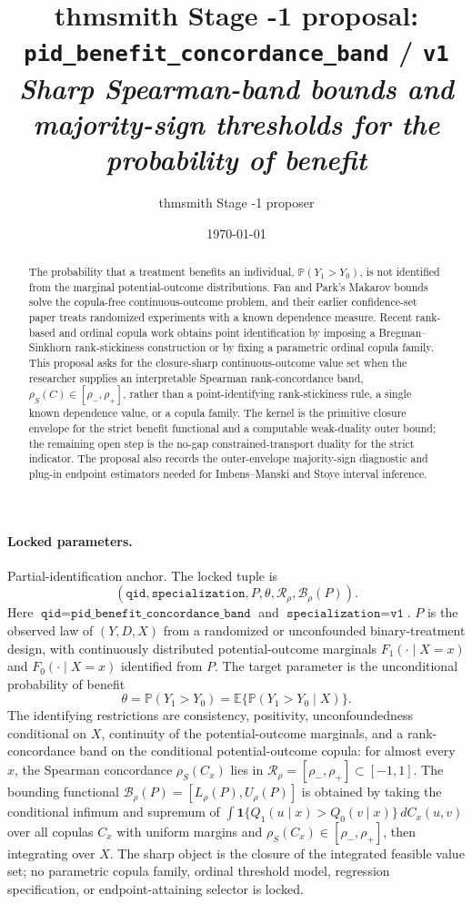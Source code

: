 \documentclass[11pt]{article}
\title{thmsmith Stage -1 proposal: \texttt{pid\_benefit\_concordance\_band} / \texttt{v1}%
  \\ \large\textit{Sharp Spearman-band bounds and majority-sign thresholds for the probability of benefit}}
\author{thmsmith Stage -1 proposer}
\date{\today}
\newcommand{\E}{\mathbb{E}}
\renewcommand{\Pr}{\mathbb{P}}
\newcommand{\one}{\mathbf{1}}
\theoremstyle{definition}
\theoremstyle{plain}
\theoremstyle{remark}
\begin{document}
\maketitle


\paragraph{Locked parameters.}
Partial-identification anchor.  The locked tuple is
\[
(\texttt{qid},\texttt{specialization},P,\theta,\mathcal R_{\rho},\mathcal B_{\rho}(P)).
\]
Here \(\texttt{qid}=\texttt{pid\_benefit\_concordance\_band}\) and \(\texttt{specialization}=\texttt{v1}\).  \(P\) is the observed law of \((Y,D,X)\) from a randomized or unconfounded binary-treatment design, with continuously distributed potential-outcome marginals \(F_1(\cdot\mid X=x)\) and \(F_0(\cdot\mid X=x)\) identified from \(P\).  The target parameter is the unconditional probability of benefit
\[
\theta=\Pr(Y_1>Y_0)=\E\{\Pr(Y_1>Y_0\mid X)\}.
\]
The identifying restrictions are consistency, positivity, unconfoundedness conditional on \(X\), continuity of the potential-outcome marginals, and a rank-concordance band on the conditional potential-outcome copula: for almost every \(x\), the Spearman concordance \(\rho_S(C_x)\) lies in \(\mathcal R_{\rho}=[\rho_-,\rho_+]\subset[-1,1]\).  The bounding functional \(\mathcal B_{\rho}(P)=[L_{\rho}(P),U_{\rho}(P)]\) is obtained by taking the conditional infimum and supremum of \(\int \one\{Q_1(u\mid x)>Q_0(v\mid x)\}\,dC_x(u,v)\) over all copulas \(C_x\) with uniform margins and \(\rho_S(C_x)\in[\rho_-,\rho_+]\), then integrating over \(X\).  The sharp object is the closure of the integrated feasible value set; no parametric copula family, ordinal threshold model, regression specification, or endpoint-attaining selector is locked.

\begin{abstract}
The probability that a treatment benefits an individual, \(\Pr(Y_1>Y_0)\), is not identified from the marginal potential-outcome distributions.  Fan and Park's Makarov bounds solve the copula-free continuous-outcome problem, and their earlier confidence-set paper treats randomized experiments with a known dependence measure.  Recent rank-based and ordinal copula work obtains point identification by imposing a Bregman--Sinkhorn rank-stickiness construction or by fixing a parametric ordinal copula family.  This proposal asks for the closure-sharp continuous-outcome value set when the researcher supplies an interpretable Spearman rank-concordance band, \(\rho_S(C)\in[\rho_-,\rho_+]\), rather than a point-identifying rank-stickiness rule, a single known dependence value, or a copula family.  The kernel is the primitive closure envelope for the strict benefit functional and a computable weak-duality outer bound; the remaining open step is the no-gap constrained-transport duality for the strict indicator.  The proposal also records the outer-envelope majority-sign diagnostic and plug-in endpoint estimators needed for Imbens--Manski and Stoye interval inference.
\end{abstract}
\end{document}
